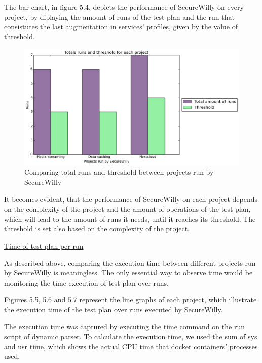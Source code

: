 The bar chart, in figure 5.4, depicts the performance of SecureWilly on every project, by diplaying the amount of runs of the test plan and the run that consistutes the last augmentation in services' profiles, given by the value of threshold.

\begin{figure}[h!]
  \centering
   \includegraphics[width=1\linewidth]{./figures/compare.png}
   \caption{Comparing total runs and threshold between projects run by SecureWilly}
\end{figure}

It becomes evident, that the performance of SecureWilly on each project depends on the complexity of the project and the amount of operations of the test plan, which will lead to the amount of runs it needs, until it reaches its threshold. The threshold is set also based on the complexity of the project.

\hfill\break
\underline{Time of test plan per run}
\hfill\break

As described above, comparing the execution time between different projects run by SecureWilly is meaningless. The only essential way to observe time would be monitoring the time execution of test plan over runs.

Figures 5.5, 5.6 and 5.7 represent the line graphs of each project, which illustrate the execution time of the test plan over runs executed by SecureWilly.

The execution time was captured by executing the time command on the run script of dynamic parser. To calculate the execution time, we used the sum of sys and usr time, which shows the actual CPU time that docker containers' processes used.

